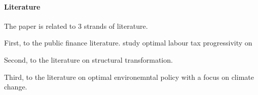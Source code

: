 \paragraph{Literature}

The paper is related to 3 strands of literature. 

First, to the public finance literature.  \cite{Heathcote2017OptimalFramework} study optimal labour tax progressivity on 

Second, to the literature on structural transformation. 

Third, to the literature on optimal environemntal policy with a focus on climate change. 

